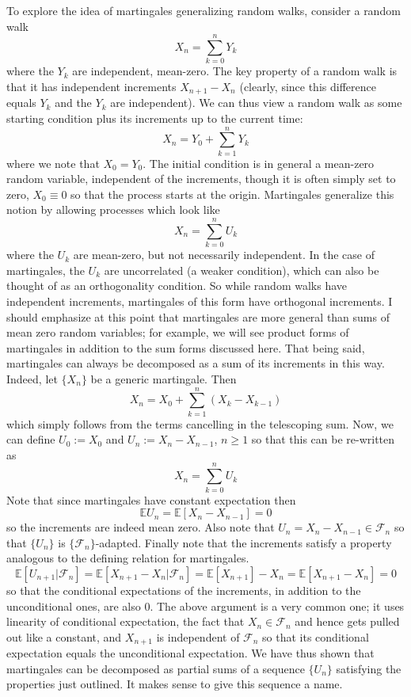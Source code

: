 \documentclass[12pt]{article}
\newcommand{\E}{\mathbb{E}}
\begin{document}
To explore the idea of martingales generalizing random walks, consider a random walk
\[X_n = \sum_{k = 0}^{n} Y_k\]
where the $Y_k$ are independent, mean-zero. The key property of a random walk is that it has independent increments $X_{n + 1} - X_n$ (clearly, since this difference equals $Y_k$ and the $Y_k$ are independent). We can thus 
view a random walk as some starting condition plus its increments up to the current time: 
\[X_n = Y_0 + \sum_{k = 1}^{n} Y_k\]
where we note that $X_0 = Y_0$. The initial condition is in general a mean-zero random variable, independent of the increments, though it is often simply set to zero, $X_0 \equiv 0$ so that the process starts at the origin. Martingales 
generalize this notion by allowing processes which look like 
\[X_n = \sum_{k = 0}^{n} U_k\]
where the $U_k$ are mean-zero, but not necessarily independent. In the case of martingales, the $U_k$ are uncorrelated (a weaker condition), which can also be thought of as an orthogonality condition. So while random walks have 
independent increments, martingales of this form have orthogonal increments. I should emphasize at this point that martingales are more general than sums of mean zero random variables; for example, we will see product forms of 
martingales in addition to the sum forms discussed here. That being said, martingales can always be decomposed as a sum of its increments in this way. Indeed, let $\{X_n\}$ be a generic martingale. Then 
\[X_n = X_0 + \sum_{k = 1}^{n} (X_k - X_{k-1})\]
which simply follows from the terms cancelling in the telescoping sum. Now, we can define $U_0 := X_0$ and $U_n := X_n - X_{n - 1}$, $n \geq 1$ so that this can be re-written as 
\[X_n = \sum_{k = 0}^{n} U_k\]
Note that since martingales have constant expectation then 
\[\E U_n = \E[X_n - X_{n-1}] = 0\]
so the increments are indeed mean zero. Also note that $U_n = X_n - X_{n-1} \in \mathcal{F}_n$ so that $\{U_n\}$ is $\{\mathcal{F}_n\}$-adapted. Finally note that the increments satisfy a property analogous to the defining relation for 
martingales. 
\[\E[U_{n + 1}|\mathcal{F}_n] = \E[X_{n + 1} - X_n|\mathcal{F}_n] = \E[X_{n + 1}] - X_n = \E[X_{n + 1} - X_n] = 0\]
so that the conditional expectations of the increments, in addition to the unconditional ones, are also $0$. The above argument is a very common one; it uses linearity of conditional expectation, the fact that $X_n \in \mathcal{F}_n$ and hence 
gets pulled out like a constant, and $X_{n + 1}$ is independent of $\mathcal{F}_n$ so that its conditional expectation equals the unconditional expectation. We have thus shown that martingales can be decomposed as partial sums of 
a sequence $\{U_n\}$ satisfying the properties just outlined. It makes sense to give this sequence a name. 
\end{document}
